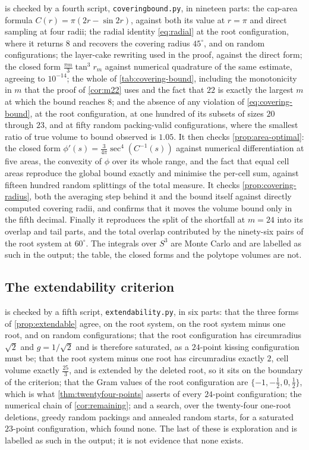 \documentclass[11pt,reqno]{amsart}
\renewcommand{\_}{\origunderscore\allowbreak}
\numberwithin{equation}{section}
\theoremstyle{plain}
\theoremstyle{definition}
\theoremstyle{remark}
\begin{document}
 is checked by a fourth script,
\texttt{covering\_bound.py}, in nineteen parts: the cap-area formula
$C(r)=\pi(2r-\sin2r)$, against both its value at $r=\pi$ and direct
sampling at four radii; the radial identity \eqref{eq:radial} at the
root configuration, where it returns $8$ and recovers the covering
radius $45^\circ$, and on random configurations; the layer-cake
rewriting used in the proof, against the direct form; the closed form
$\tfrac{\pi m}{3}\tan^3r_m$ against numerical quadrature of the same
estimate, agreeing to $10^{-14}$; the whole of
\cref{tab:covering-bound}, including the monotonicity in $m$ that the
proof of \cref{cor:m22} uses and the fact that $22$ is exactly the
largest $m$ at which the bound reaches $8$; and the absence of any
violation of \eqref{eq:covering-bound}, at the root configuration, at
one hundred of its subsets of sizes $20$ through $23$, and at fifty
random packing-valid configurations, where the smallest ratio of true
volume to bound observed is $1.05$. It then checks
\cref{prop:area-optimal}: the closed form
$\phi'(s)=\tfrac{3}{4\pi}\sec^4(C^{-1}(s))$ against numerical
differentiation at five areas, the convexity of $\phi$ over its whole
range, and the fact that equal cell areas reproduce the global bound
exactly and minimise the per-cell sum, against fifteen hundred random
splittings of the total measure. It checks \cref{prop:covering-radius}, both the
averaging step behind it and the bound itself against directly computed
covering radii, and confirms that it moves the volume bound only in the
fifth decimal. Finally it reproduces the split of the
shortfall at $m=24$ into its overlap and tail parts, and the total
overlap contributed by the ninety-six pairs of the root system at
$60^\circ$. The integrals over $S^3$ are Monte Carlo and are labelled as
such in the output; the table, the closed forms and the polytope volumes
are not.

\subsection*{The extendability criterion}

 is checked by a fifth script,
\texttt{extendability.py}, in six parts: that the three forms of
\cref{prop:extendable} agree, on the root system, on the root system
minus one root, and on random configurations; that the root
configuration has circumradius $\sqrt2$ and $g=1/\sqrt2$ and is
therefore saturated, as a $24$-point kissing configuration must be; that
the root system minus one root has circumradius exactly $2$, cell volume
exactly $\tfrac{25}3$, and is extended by the deleted root, so it sits
on the boundary of the criterion; that the Gram values of the root
configuration are $\{-1,-\tfrac12,0,\tfrac12\}$, which is what
\cref{thm:twentyfour-points} asserts of every $24$-point configuration; the
numerical chain of \cref{cor:remaining}; and a search, over the
twenty-four one-root deletions, greedy random packings and annealed
random starts, for a saturated $23$-point configuration, which found
none. The last of these is exploration and is labelled as such in the
output; it is not evidence that none exists.
\end{document}
